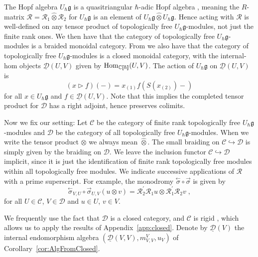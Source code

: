 \documentclass[12pt,dvipsnames]{article}
\numberwithin{equation}{section}
\theoremstyle{definition}
\newcommand{\cat}[1]{\mathcal{#1}}
\newcommand{\C}{\ensuremath{\mathbb{C}}}
\newcommand{\1}{\ensuremath{\mathbbm{1}}}
\DeclareMathOperator{\Hom}{Hom}
\newcommand{\lc}{\ensuremath{\overset{\rightarrow}{\sigma}}}
\newcommand{\rc}{\ensuremath{\overset{\leftarrow}{\sigma}}}
\newcommand{\blank}{{-}}
\newcommand{\llb}{[\hspace{-1.7pt}[}
\newcommand{\rrb}{]\hspace{-1.7pt}]}
\begin{document}
The Hopf algebra $U_\hbar\mathfrak{g}$ is a quasitriangular $\hbar$-adic Hopf algebra \cite[Thm.\,8.17]{KS97}, meaning the $R$-matrix $\mathcal{R} = \mathcal{R}_1\widehat{\otimes}\mathcal{R}_2$ for $U_\hbar\mathfrak{g}$ is an element of $U_\hbar\mathfrak{g}\widehat{\otimes}U_\hbar\mathfrak{g}$. Hence acting with $\mathcal{R}$ is well-defined on any tensor product of topologically free $U_\hbar\mathfrak{g}$-modules, not just the finite rank ones. We then have that the category of topologically free $U_\hbar\mathfrak{g}$-modules is a braided monoidal category. From \cite[Exercise\,XVI.2]{Ka95} we also have that the category of topologically free $U_\hbar\mathfrak{g}$-modules is a closed monoidal category, with the internal-hom objects $\underline{\cat{D}}(U,V)$ given by $\Hom_{\C\llb\hbar\rrb}(U,V)$. The action of $U_\hbar\mathfrak{g}$ on $\underline{\cat{D}}(U,V)$ is
\begin{equation}
    (x\triangleright f)(\blank) = x_{(1)}f(S(x_{(2)})\blank)
\end{equation}
for all $x\in U_\hbar\mathfrak{g}$ and $f\in \underline{\cat{D}}(U,V)$. Note that this implies the completed tensor product for $\cat{D}$ has a right adjoint, hence preserves colimits.

Now we fix our setting: Let $\cat{C}$ be the category of finite rank topologically free $U_\hbar\mathfrak{g}$-modules and $\cat{D}$ be the category of all topologically free $U_\hbar\mathfrak{g}$-modules. When we write the tensor product $\otimes$ we always mean $\widehat{\otimes}$. The small braiding on $\cat{C}\hookrightarrow\cat{D}$ is simply given by the braiding on $\cat{D}$. We leave the inclusion functor $\cat{C}\hookrightarrow\cat{D}$ implicit, since it is just the identification of finite rank topologically free modules within all topologically free modules. We indicate successive applications of $\mathcal{R}$ with a prime superscript. For example, the monodromy $\rc\circ\lc$ is given by
\begin{equation}\label{eq:SmallHexHopf}
   \rc_{V,U}\circ\lc_{U,V}(u\otimes v) = \mathcal{R}_2^\prime\mathcal{R}_1u\otimes \mathcal{R}_1^\prime\mathcal{R}_2v \;,
\end{equation}
for all $U\in\cat{C}$, $V\in\cat{D}$ and $u\in U$, $v\in V$.

We frequently use the fact that $\cat{D}$ is a closed category, and $\cat{C}$ is rigid \cite[Sec.\,XVII.3]{Ka95}, which allows us to apply the results of Appendix~\ref{app:closed}. Denote by $\underline{\cat{D}}(V)$ the internal endomorphism algebra $(\underline{\cat{D}}(V,V),m_{V,V}^V,u_V)$ of Corollary~\ref{cor:AlgFromClosed}.
\end{document}
